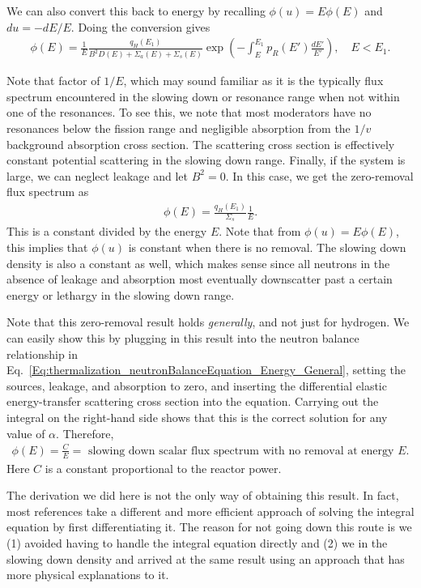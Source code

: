 We can also convert this back to energy by recalling $\phi(u) = E \phi(E)$ and $du = -dE/E$. Doing the conversion gives
\begin{align}
  \phi(E) = \frac{1}{E} \frac{ q_H(E_1) }{ B^2 D(E) + \Sigma_a(E) + \Sigma_s(E) } \exp\left( -\int_E^{E_1} p_R(E') \frac{dE'}{E'}  \right) , \quad E < E_1 . \label{Eq:thermalization_fluxSpectrum_Hydrogen}
\end{align}

Note that factor of $1/E$, which may sound familiar as it is the typically flux spectrum encountered in the slowing down or resonance range when not within one of the resonances. To see this, we note that most moderators have no resonances below the fission range and negligible absorption from the $1/v$ background absorption cross section. The scattering cross section is effectively constant potential scattering in the slowing down range. Finally, if the system is large, we can neglect leakage and let $B^2 = 0$. In this case, we get the zero-removal flux spectrum as
\begin{align}
  \phi(E) =  \frac{ q_H(E_1) }{ \Sigma_s } \frac{1}{E} .
\end{align}
This is a constant divided by the energy $E$. Note that from $\phi(u) = E \phi(E)$, this implies that $\phi(u)$ is constant when there is no removal. The slowing down density is also a constant as well, which makes sense since all neutrons in the absence of leakage and absorption most eventually downscatter past a certain energy or lethargy in the slowing down range.

Note that this zero-removal result holds \emph{generally}, and not just for hydrogen. We can easily show this by plugging in this result into the neutron balance relationship in Eq.~\eqref{Eq:thermalization_neutronBalanceEquation_Energy_General}, setting the sources, leakage, and absorption to zero, and inserting the differential elastic energy-transfer scattering cross section into the equation. Carrying out the integral on the right-hand side shows that this is the correct solution for any value of $\alpha$. Therefore,
\begin{align}
  \phi(E) = \frac{C}{E} = \text{ slowing down scalar flux spectrum with no removal at energy $E$.} \nonumber
\end{align}
Here $C$ is a constant proportional to the reactor power.

The derivation we did here is not the only way of obtaining this result. In fact, most references take a different and more efficient approach of solving the integral equation by first differentiating it. The reason for not going down this route is we (1) avoided having to handle the integral equation directly and (2) we in the slowing down density and arrived at the same result using an approach that has more physical explanations to it.

